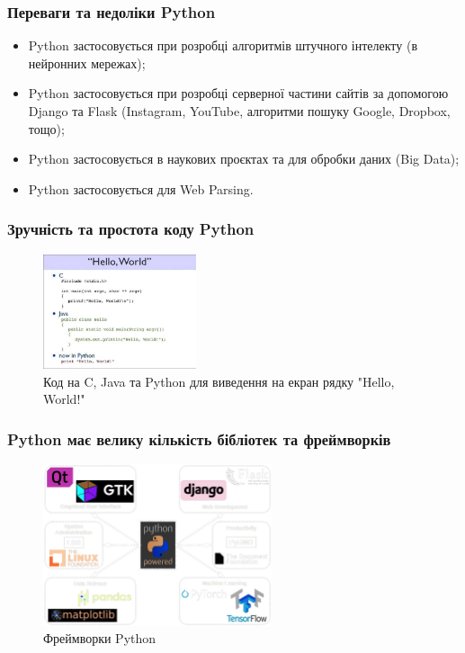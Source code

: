 \begin{frame}
\frametitle{Переваги та недоліки Python}
\begin{itemize}
  \item Python  застосовується при розробці алгоритмів штучного інтелекту (в нейронних мережах);
  \item Python  застосовується при розробці серверної частини сайтів за допомогою Django та Flask (Instagram, YouTube, алгоритми пошуку Google, Dropbox, тощо);
  \item Python  застосовується в наукових проєктах та для обробки даних (Big Data);
  \item Python  застосовується для Web Parsing.
\end{itemize}
\end{frame}


\begin{frame}
\frametitle{Зручність та простота коду Python}
\begin{figure}
\begin{center}
 \includegraphics[width=0.4\textwidth]{pictures/helloworld.png}
\caption{Код на C, Java та Python для виведення на екран рядку "Hello, World!"}
\label{python_site} 
\end{center}
\end{figure}
\end{frame}

\begin{frame}
\frametitle{Python має велику кількість бібліотек та фреймворків}
\begin{figure}
\begin{center}
 \includegraphics[width=0.6\textwidth]{pictures/python_frameworks1.png}
\caption{Фреймворки Python}
\label{python_site} 
\end{center}
\end{figure}
\end{frame}

